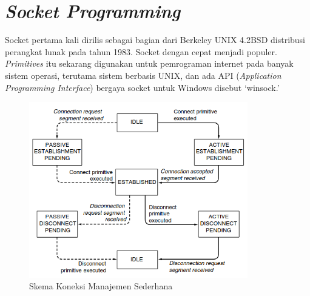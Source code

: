 
\nocite{tanenbaum2021computer}

\section{\emph{Socket Programming}}

Socket pertama kali dirilis sebagai bagian dari Berkeley UNIX 4.2BSD distribusi perangkat lunak pada tahun 1983. Socket dengan cepat menjadi populer. \emph{Primitives} itu sekarang digunakan untuk pemrograman internet pada banyak sistem operasi, terutama sistem berbasis UNIX, dan ada API (\emph{Application Programming Interface}) bergaya socket untuk Windows disebut `winsock.'

\begin{figure}[H]
  \centering{}
	\includegraphics[width=0.85\textwidth]{gambar/a_state_diagram_for_a_simple_connection_management_scheme}
  \caption{Skema Koneksi Manajemen Sederhana}
\end{figure}

